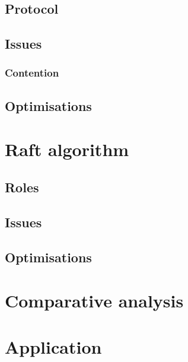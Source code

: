 \documentclass[12pt, a4paper]{article}
\begin{document}
\subsection{Protocol}

\subsection{Issues}

  \subsubsection{Contention}

\subsection{Optimisations}



\section{Raft algorithm}

\subsection{Roles}

\subsection{Issues}

\subsection{Optimisations}


\section{Comparative analysis}


\section{Application}






\end{document}
